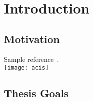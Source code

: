 \chapter{Introduction}

\section{Motivation}
Sample reference~\cite{Weng98}.\\
\texttt{[image: acis]}
\section{Thesis Goals}
